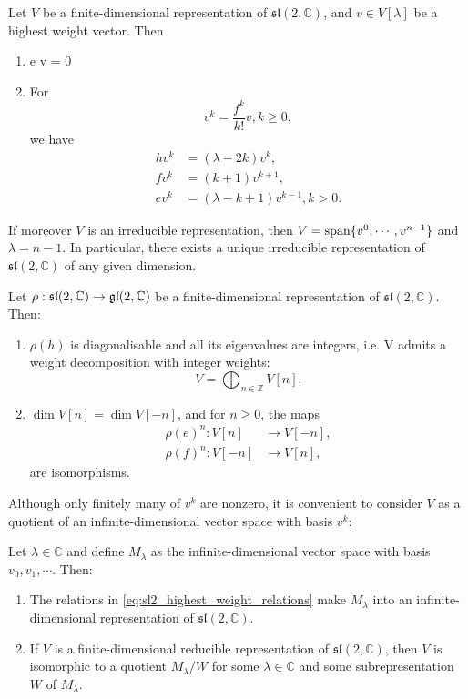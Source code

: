 \documentclass{report}
\begin{document}
\begin{theorem}
    Let $V$ be a finite-dimensional representation of $\mathfrak{sl}(2, \mathbb C)$, and $v \in V[\lambda]$ be a highest weight vector. 
    Then
    \begin{enumerate}[label = (\roman*)]
        \item e v = 0
        \item For 
        \[
        v^k = \frac{f^k}{k!} v, k \geq 0,
        \]
        we have
        \begin{align}\label{eq:sl2_highest_weight_relations}
            h v^k &= (\lambda - 2k) v^k,\\
            f v^k &= (k+1) v^{k+1},\\
            e v^k &= (\lambda - k + 1) v^{k-1}, k > 0.           
        \end{align}
    \end{enumerate}
    If moreover $V$ is an irreducible representation, then $V = \operatorname{span}\{v^0, \cdots, v^{n-1}\}$ and $\lambda = n-1$.
    In particular, there exists a unique irreducible representation of $\mathfrak{sl}(2,\mathbb C)$ of any given dimension.
\end{theorem}
\begin{corollary}
    Let $\rho: \mathfrak{sl}(2,\mathbb C) \to \operatorname{{\mathfrak{gl}}}(2,\mathbb C)$ be a finite-dimensional representation of $\mathfrak{sl}(2, \mathbb C)$.
    Then:
    \begin{enumerate}
        \item $\rho(h)$ is diagonalisable and all its eigenvalues are integers, i.e.
        V admits a weight decomposition with integer weights:
        \[
        V = \bigoplus_{n \in \mathbb Z} V[n].
        \]
        \item $\dim V[n] = \dim V[-n]$, and for $n \geq 0$, the maps
        \begin{align*}
            \rho(e)^n: V[n] &\rightarrow V[-n],\\
            \rho(f)^n: V[-n] &\rightarrow V[n],
        \end{align*}
        are isomorphisms.
    \end{enumerate}
\end{corollary}
Although only finitely many of $v^k$ are nonzero, it is convenient to consider $V$ as a quotient of an infinite-dimensional vector space with basis $v^k$:
\begin{lemma}
    Let $\lambda \in \mathbb C$ and define $M_\lambda$ as the infinite-dimensional vector space with basis $v_0, v_1, \cdots$. Then:
    \begin{enumerate}[label = (\roman*)]
        \item The relations in \cref{eq:sl2_highest_weight_relations} make $M_\lambda$ into an infinite-dimensional representation of $\mathfrak{sl}(2, \mathbb C)$.
        \item If $V$ is a finite-dimensional reducible representation of $\mathfrak{sl}(2, \mathbb C)$, then $V$ is isomorphic to a quotient $M_\lambda / W$ for some $\lambda \in \mathbb C$ and some subrepresentation $W$ of $M_\lambda$.
    \end{enumerate}
\end{lemma}
\end{document}
